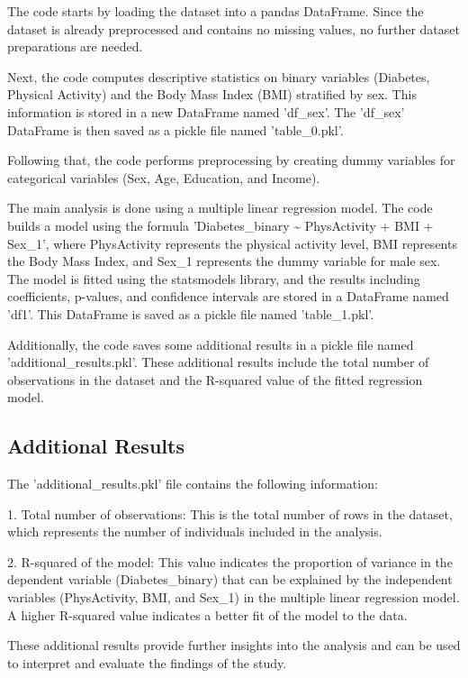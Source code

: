 \documentclass[11pt]{article}
\begin{document}
The code starts by loading the dataset into a pandas DataFrame. Since the dataset is already preprocessed and contains no missing values, no further dataset preparations are needed.

Next, the code computes descriptive statistics on binary variables (Diabetes, Physical Activity) and the Body Mass Index (BMI) stratified by sex. This information is stored in a new DataFrame named 'df\_sex'. The 'df\_sex' DataFrame is then saved as a pickle file named 'table\_0.pkl'.

Following that, the code performs preprocessing by creating dummy variables for categorical variables (Sex, Age, Education, and Income).

The main analysis is done using a multiple linear regression model. The code builds a model using the formula 'Diabetes\_binary \textasciitilde{} PhysActivity + BMI + Sex\_1', where PhysActivity represents the physical activity level, BMI represents the Body Mass Index, and Sex\_1 represents the dummy variable for male sex. The model is fitted using the statsmodels library, and the results including coefficients, p-values, and confidence intervals are stored in a DataFrame named 'df1'. This DataFrame is saved as a pickle file named 'table\_1.pkl'.

Additionally, the code saves some additional results in a pickle file named 'additional\_results.pkl'. These additional results include the total number of observations in the dataset and the R-squared value of the fitted regression model.


\subsection{Additional Results}

The 'additional\_results.pkl' file contains the following information:

1. Total number of observations: This is the total number of rows in the dataset, which represents the number of individuals included in the analysis.

2. R-squared of the model: This value indicates the proportion of variance in the dependent variable (Diabetes\_binary) that can be explained by the independent variables (PhysActivity, BMI, and Sex\_1) in the multiple linear regression model. A higher R-squared value indicates a better fit of the model to the data.

These additional results provide further insights into the analysis and can be used to interpret and evaluate the findings of the study.
\end{document}
